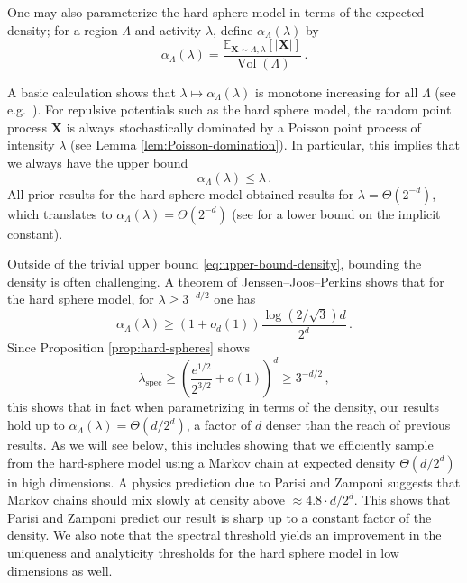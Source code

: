 \documentclass[10pt]{amsart}
\theoremstyle{definition}
\theoremstyle{remark}
\newcommand{\spec}{{\mathrm{spec}}}
\newcommand{\bX}{\mathbf{X}}
\newcommand{\Vol}{\operatorname{Vol}}
\newcommand{\E}{\mathbb{E}}
\begin{document}
	One may also parameterize the hard sphere model in terms of the expected density; for a region $\Lambda$ and activity $\lambda$, define $\alpha_{\Lambda}(\lambda)$ by \begin{equation}\label{eq:point-density-definition}
		\alpha_\Lambda(\lambda) =  \frac{\E_{\bX \sim \Lambda,\lambda}[|\bX|]}{\Vol(\Lambda)}\,.
	\end{equation}
	
	A basic calculation shows that $\lambda \mapsto \alpha_{\Lambda}(\lambda)$ is monotone increasing for all $\Lambda$ (see e.g.\ \cite[Lemma 6]{jenssen2019hard}).  
	For repulsive potentials such as the hard sphere model, the random point process $\bX$ is always stochastically dominated by a Poisson point process of intensity $\lambda$ (see Lemma \ref{lem:Poisson-domination}).  In particular, this implies that we always have the upper bound 
	\begin{equation}\label{eq:upper-bound-density}
		\alpha_{\Lambda}(\lambda) \leq \lambda\,.
	\end{equation}  
	All prior results for the hard sphere model obtained results for $\lambda = \Theta(2^{-d})$, which translates to $\alpha_{\Lambda}(\lambda) = \Theta(2^{-d})$ (see \cite{michelen2023analyticity} for a lower bound on the implicit constant).  
	
	Outside of the trivial upper bound \eqref{eq:upper-bound-density}, bounding the density is often challenging.  A theorem of Jenssen--Joos--Perkins \cite[Theorem~2]{jenssen2019hard} shows that for the hard sphere model, for $\lambda \geq 3^{-d/2}$ one has \begin{equation}\label{eq:LB-density}
		\alpha_\Lambda(\lambda) \geq (1 + o_d(1))\frac{\log(2/\sqrt{3}) d}{2^d} \,.
	\end{equation}
	Since Proposition \ref{prop:hard-spheres} shows $$\lambda_{\spec} \geq \left( \frac{e^{1/2}}{2^{3/2}} + o(1)\right)^{d}  \geq 3^{-d/2}\,, $$
	this shows that in fact when parametrizing in terms of the density, our results hold up to $\alpha_{\Lambda}(\lambda) = \Theta(d/ 2^d)$, a factor of $d$ denser than the reach of previous results.  As we will see below, this includes showing that we efficiently sample from the hard-sphere model using a Markov chain at expected density $\Theta(d/2^d)$ in high dimensions.  A physics prediction due to Parisi and Zamponi \cite[Eq.~(54)]{parisi2010mean} suggests that Markov chains should mix slowly at density above $\approx 4.8 \cdot d / 2^d$.  This shows that Parisi and Zamponi predict our result is sharp up to a constant factor of the density.   
	We also note that the spectral threshold yields an improvement in the uniqueness and analyticity thresholds for the hard sphere model in low dimensions as well.  
	
\end{document}
